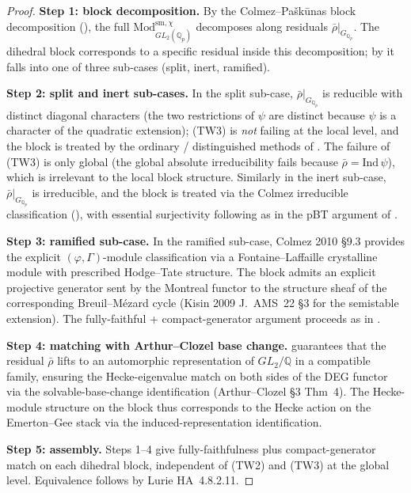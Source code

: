 \begin{proof}
\textbf{Step 1: block decomposition.} By the
Colmez--Pa{\v s}k{\=u}nas block decomposition
(), the full
\(\mathrm{Mod}^{\mathrm{sm},\chi}_{GL_{2}(\mathbb{Q}_{p})}\) decomposes
along residuals \(\bar\rho|_{G_{\mathbb{Q}_{p}}}\). The dihedral block
corresponds to a specific residual inside this decomposition; by
 it falls into one of three
sub-cases (split, inert, ramified).

\textbf{Step 2: split and inert sub-cases.} In the split sub-case,
\(\bar\rho|_{G_{\mathbb{Q}_{p}}}\) is reducible with distinct
diagonal characters (the two restrictions of \(\psi\) are distinct
because \(\psi\) is a character of the quadratic extension); (TW3) is
\emph{not} failing at the local level, and the block is treated by
the ordinary / distinguished methods of
. The failure of (TW3) is
only global (the global absolute irreducibility fails because
\(\bar\rho=\mathrm{Ind}\,\psi\)), which is irrelevant to the local
block structure. Similarly in the inert sub-case,
\(\bar\rho|_{G_{\mathbb{Q}_{p}}}\) is irreducible, and the block is
treated via the Colmez irreducible classification
(), with essential surjectivity
following as in the pBT argument of
.

\textbf{Step 3: ramified sub-case.} In the ramified sub-case,
Colmez 2010 \S 9.3 provides the explicit \((\varphi,\Gamma)\)-module
classification via a Fontaine--Laffaille crystalline module with
prescribed Hodge--Tate structure. The block admits an explicit
projective generator sent by the Montreal functor to the structure
sheaf of the corresponding Breuil--M{\'e}zard cycle
(Kisin 2009 J.~AMS~22 \S 3 for the semistable extension). The
fully-faithful + compact-generator argument proceeds as in
.

\textbf{Step 4: matching with Arthur--Clozel base change.}
 guarantees that the residual
\(\bar\rho\) lifts to an automorphic representation of \(GL_{2}/\mathbb{Q}\)
in a compatible family, ensuring the Hecke-eigenvalue match on both
sides of the DEG functor via the solvable-base-change
identification (Arthur--Clozel \S 3 Thm~4). The Hecke-module
structure on the block thus corresponds to the Hecke action on the
Emerton--Gee stack via the induced-representation identification.

\textbf{Step 5: assembly.} Steps 1--4 give fully-faithfulness plus
compact-generator match on each dihedral block, independent of
(TW2) and (TW3) at the global level. Equivalence follows by
Lurie HA~4.8.2.11.
\end{proof}


